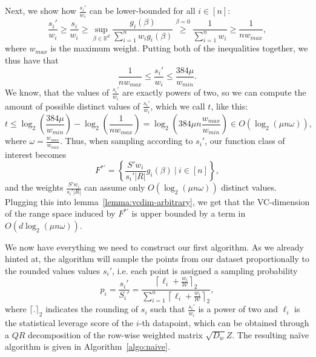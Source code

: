 Next, we show how $\frac{s_i'}{w_i}$ can be lower-bounded for all
$i \in [n]$:
\begin{equation*}
    \frac{s_i'}{w_i} \geq \frac{s_i}{w_i}
    \geq \sup_{\beta \in \mathbb{R}^d} \frac{g_i(\beta)}{\sum_{i=1}^n w_ig_i(\beta)}
    \overset{\beta = 0}{\geq} \frac{1}{\sum_{i=1}^n w_i}
    \geq \frac{1}{n w_{max}},
\end{equation*}
where $w_{max}$ is the maximum weight. Putting both of the inequalities
together, we thus have that
\begin{equation*}
    \frac{1}{n w_{max}} \leq \frac{s_i'}{w_i} \leq \frac{384\mu}{w_{min}}.
\end{equation*}
We know, that the values of $\frac{s_i'}{w_i}$ are exactly powers
of two, so we can compute the amount of possible distinct values of
$\frac{s_i'}{w_i}$, which we call $t$, like this:
\begin{equation*}
    t \leq \log_2\left( \frac{384 \mu}{w_{min}}\right)
    - \log_2\left( \frac{1}{n w_{max}}\right)
    = \log_2\left(384\mu n \frac{w_{max}}{w_{min}}\right)
    \in O\left(\log_2(\mu n \omega)\right),
\end{equation*}
where $\omega = \frac{w_{max}}{w_{min}}$.
Thus, when sampling according to $s_i'$, our function class of interest
becomes
\begin{equation*}
    F^{\ast'} = \left\{ \frac{S' w_i}{s_i' |R|} g_i(\beta) \ |\ i \in [n] \right\},
\end{equation*}
and the weights $\frac{S' w_i}{s_i' |R|}$ can assume only
$O(\log_2(\mu n \omega))$ distinct values.
Plugging this into lemma~\ref{lemma:vcdim-arbitrary}, we get that
the VC-dimension of the range space induced by $F^{\ast'}$ is
upper bounded by a term in $O(d \log_2(\mu n \omega))$.

We now have everything we need to construct our first algorithm.
As we already hinted at, the algorithm will sample the points
from our dataset proportionally to the rounded values values
$s_i'$, i.e. each point is assigned a sampling probability
\begin{equation*}
    p_i = \frac{s_i'}{S_i'} =
    \frac{\left\lceil \ell_i + \frac{w_i}{\mathcal{W}} \right\rceil_2}
    {\sum_{i=1}^n \left\lceil \ell_i + \frac{w_i}{\mathcal{W}} \right\rceil_2},
\end{equation*}
where $\lceil . \rceil_2$ indicates the rounding of $s_i$ such that
$\frac{s_i'}{w_i}$ is a power of two and $\ell_i$ is the statistical
leverage score of the $i$-th datapoint, which can be obtained through
a $QR$ decomposition of the row-wise weighted matrix $\sqrt{D_w}Z$.
The resulting na\"ive algorithm is given in Algorithm~\ref{algo:naive}.

